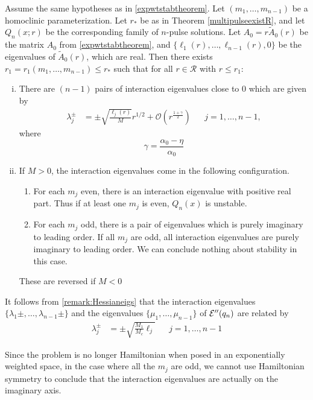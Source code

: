 \documentclass[thesis.tex]{subfiles}
\begin{document}
\begin{corollary}\label{corr:eiglocR}
Assume the same hypotheses as in \cref{expwtstabtheorem}. Let $(m_1, \dots, m_{n-1})$ be a homoclinic parameterization. Let $r_*$ be as in Theorem \ref{multipulseexistR}, and let $Q_n(x; r)$ be the corresponding family of $n$-pulse solutions. Let $A_0 = r \tilde{A}_0(r)$ be the matrix $A_0$ from \cref{expwtstabtheorem}, and $\{ \ell_1(r), \dots, \ell_{n-1}(r), 0 \}$ be the eigenvalues of $\tilde{A}_0(r)$, which are real. Then there exists $r_1 = r_1(m_1, \dots, m_{n-1}) \leq r_*$ such that for all $r \in \mathcal{R}$ with $r \leq r_1$:
\begin{enumerate}[(i)]
\item There are $(n-1)$ pairs of interaction eigenvalues close to 0 which are given by
\begin{align}\label{hominteigs}
\lambda_j^\pm &= \pm \sqrt{ \frac{\ell_j(r)}{M}} r^{1/2} + 
\mathcal{O}\left( r^{\frac{1 + \gamma}{2}} \right) && j = 1,\dots,n-1,
\end{align}
where
\[
\gamma = \frac{\alpha_0 - \eta}{\alpha_0}
\]
\item If $M > 0$, the interaction eigenvalues come in the following configuration.
\begin{enumerate}
	\item For each $m_j$ even, there is an interaction eigenvalue with positive real part. Thus if at least one $m_j$ is even, $Q_n(x)$ is unstable.
	\item For each $m_j$ odd, there is a pair of eigenvalues which is purely imaginary to leading order. If all $m_j$ are odd, all interaction eigenvalues are purely imaginary to leading order. We can conclude nothing about stability in this case.
\end{enumerate}
These are reversed if $M < 0$
\end{enumerate}
\end{corollary}

\begin{remark}\label{remark:eigrelation}
It follows from \cref{remark:Hessianeigs} that the interaction eigenvalues $\{ \lambda_1\pm, \dots, \lambda_{n-1}\pm \}$ and the eigenvalues $\{ \mu_1, \dots, \mu_{n-1} \}$ of $\mathcal{E}''(q_n)$ are related by
\begin{align}\label{eigrelation}
\lambda_j^\pm &= \pm \sqrt{ \frac{M_1}{M_c} \ell_j} && j = 1, \dots, n-1
\end{align}
\end{remark}

\begin{remark}
Since the problem is no longer Hamiltonian when posed in an exponentially weighted space, in the case where all the $m_j$ are odd, we cannot use Hamiltonian symmetry to conclude that the interaction eigenvalues are actually on the imaginary axis.
\end{remark}
\end{document}
